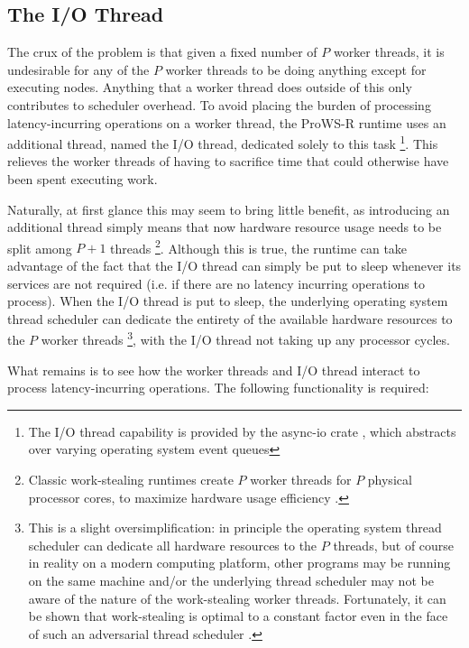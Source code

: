 \documentclass[bsc,frontabs,singlespacing,parskip,deptreport,normalheadings]{infthesis}
\begin{document}
\subsection{The I/O Thread}

The crux of the problem is that given a fixed number of \(P\) worker threads, it
is undesirable for any of the \(P\) worker threads to be doing anything except
for executing nodes. Anything that a worker thread does outside of this only
contributes to scheduler overhead. To avoid placing the burden of processing
latency-incurring operations on a worker thread, the ProWS-R runtime uses an
additional thread, named the I/O thread, dedicated solely to this task
\footnote{The I/O thread capability is provided by the async-io crate
\cite{noauthor_async-io_2022}, which abstracts over varying operating system
event queues}. This relieves the worker threads of having to sacrifice time that
could otherwise have been spent executing work.

Naturally, at first glance this may seem to bring little benefit, as introducing
an additional thread simply means that now hardware resource usage needs to be
split among \(P + 1\) threads \footnote{Classic work-stealing runtimes create
    \(P\) worker threads for \(P\) physical processor cores, to maximize
hardware usage efficiency \cite{arora_thread_1998}.}. Although this is true, the
runtime can take advantage of the fact that the I/O thread can simply be put to
sleep whenever its services are not required (i.e. if there are no latency
incurring operations to process). When the I/O thread is put to sleep, the
underlying operating system thread scheduler can dedicate the entirety of the
available hardware resources to the \(P\) worker threads \footnote{This is a
    slight oversimplification: in principle the operating system thread
    scheduler can dedicate all hardware resources to the \(P\) threads, but of
    course in reality on a modern computing platform, other programs may be
    running on the same machine and/or the underlying thread scheduler may not
    be aware of the nature of the work-stealing worker threads. Fortunately, it
can be shown that work-stealing is optimal to a constant factor even in the face
of such an adversarial thread scheduler \cite{arora_thread_1998}.}, with the I/O
thread not taking up any processor cycles.

What remains is to see how the worker threads and I/O thread interact to process
latency-incurring operations. The following functionality is required:
\end{document}
